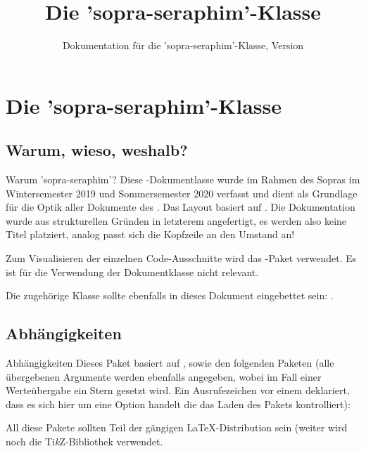 \documentclass{sopra-seraphim}
\title{Die 'sopra-seraphim'-Klasse}
\subtitle{Dokumentation für die 'sopra-seraphim'-Klasse, Version \thesosversion}
\begin{document}
    \Intro

    \section{Die 'sopra-seraphim'-Klasse}
    \subsection{Warum, wieso, weshalb?}
    \begin{frame}{Warum 'sopra-seraphim'?}
        Diese \LaTeXe-Dokumentlasse wurde im Rahmen des Sopras im
        Wintersemester 2019 und Sommersemester 2020 verfasst und dient als
        Grundlage für die Optik aller Dokumente des .
        Das Layout basiert auf . Die Dokumentation wurde aus strukturellen Gründen in letzterem angefertigt, es werden also keine Titel platziert, analog passt sich die Kopfzeile an den Umstand an!\par
        Zum Visualisieren der einzelnen Code-Ausschnitte wird das
        -Paket verwendet. Es ist für die Verwendung der Dokumentklasse
        nicht relevant.\par
        Die zugehörige Klasse sollte ebenfalls in dieses Dokument eingebettet sein: .
    \end{frame}

    \subsection{Abhängigkeiten}
    \begin{frame}[fragile]{Abhängigkeiten}
    Dieses Paket basiert auf , sowie den folgenden Paketen (alle übergebenen Argumente werden ebenfalls
    angegeben, wobei im Fall einer Werteübergabe ein Stern gesetzt wird. Ein Ausrufezeichen vor einem  deklariert, dass es sich hier um eine Option handelt die das Laden des Pakets kontrolliert):
    \begingroup\footnotesize
    \begin{multicols}{3}
    \end{multicols}
    \endgroup
    All diese Pakete sollten Teil der gängigen \LaTeX-Distribution sein (weiter
    wird noch die Ti\textit{k}Z-Bibliothek  verwendet.
    \end{frame}
\end{document}
